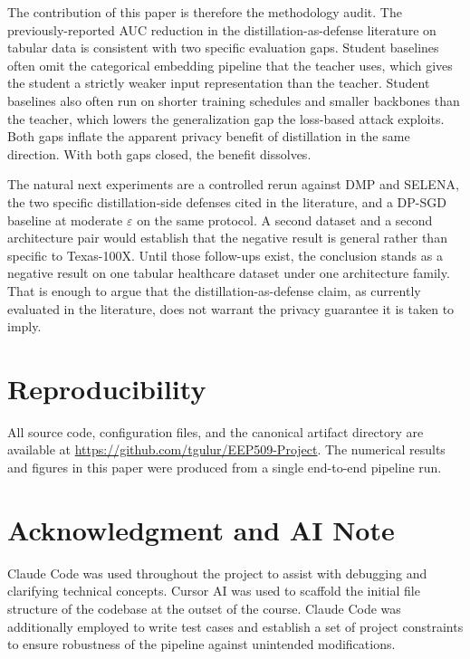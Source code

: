 \documentclass[conference]{IEEEtran}
\begin{document}
The contribution of this paper is therefore the methodology audit. The previously-reported AUC reduction in the distillation-as-defense literature on tabular data is consistent with two specific evaluation gaps. Student baselines often omit the categorical embedding pipeline that the teacher uses, which gives the student a strictly weaker input representation than the teacher. Student baselines also often run on shorter training schedules and smaller backbones than the teacher, which lowers the generalization gap the loss-based attack exploits. Both gaps inflate the apparent privacy benefit of distillation in the same direction. With both gaps closed, the benefit dissolves.

The natural next experiments are a controlled rerun against DMP and SELENA, the two specific distillation-side defenses cited in the literature, and a DP-SGD baseline at moderate $\varepsilon$ on the same protocol. A second dataset and a second architecture pair would establish that the negative result is general rather than specific to Texas-100X. Until those follow-ups exist, the conclusion stands as a negative result on one tabular healthcare dataset under one architecture family. That is enough to argue that the distillation-as-defense claim, as currently evaluated in the literature, does not warrant the privacy guarantee it is taken to imply.

\section*{Reproducibility}

All source code, configuration files, and the canonical artifact directory are available at \url{https://github.com/tgulur/EEP509-Project}. The numerical results and figures in this paper were produced from a single end-to-end pipeline run.

\section*{Acknowledgment and AI Note}

Claude Code was used throughout the project to assist with debugging and clarifying technical concepts. Cursor AI was used to scaffold the initial file structure of the codebase at the outset of the course. Claude Code was additionally employed to write test cases and establish a set of project constraints to ensure robustness of the pipeline against unintended modifications.
\end{document}
